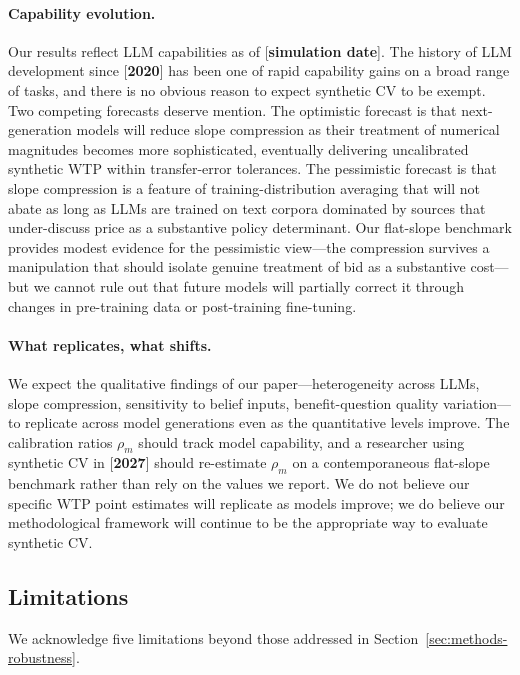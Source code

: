 \documentclass[12pt]{article}
\begin{document}
\paragraph{Capability evolution.} Our results reflect LLM capabilities as of [\textbf{simulation date}]. The history of LLM development since [\textbf{2020}] has been one of rapid capability gains on a broad range of tasks, and there is no obvious reason to expect synthetic CV to be exempt. Two competing forecasts deserve mention. The optimistic forecast is that next-generation models will reduce slope compression as their treatment of numerical magnitudes becomes more sophisticated, eventually delivering uncalibrated synthetic WTP within transfer-error tolerances. The pessimistic forecast is that slope compression is a feature of training-distribution averaging that will not abate as long as LLMs are trained on text corpora dominated by sources that under-discuss price as a substantive policy determinant. Our flat-slope benchmark provides modest evidence for the pessimistic view---the compression survives a manipulation that should isolate genuine treatment of bid as a substantive cost---but we cannot rule out that future models will partially correct it through changes in pre-training data or post-training fine-tuning.

\paragraph{What replicates, what shifts.} We expect the qualitative findings of our paper---heterogeneity across LLMs, slope compression, sensitivity to belief inputs, benefit-question quality variation---to replicate across model generations even as the quantitative levels improve. The calibration ratios $\rho_m$ should track model capability, and a researcher using synthetic CV in [\textbf{2027}] should re-estimate $\rho_m$ on a contemporaneous flat-slope benchmark rather than rely on the values we report. We do not believe our specific WTP point estimates will replicate as models improve; we do believe our methodological framework will continue to be the appropriate way to evaluate synthetic CV.

\subsection{Limitations}\label{sec:disc-limitations}

We acknowledge five limitations beyond those addressed in Section~\ref{sec:methods-robustness}.
\end{document}
